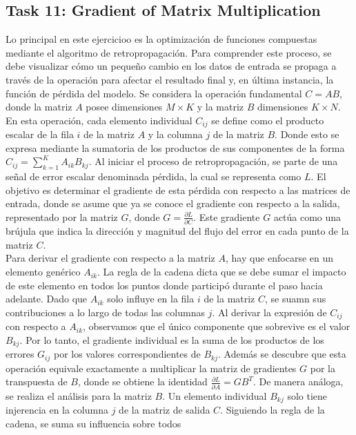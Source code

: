 ﻿\documentclass[12pt]{article}
\begin{document}
\subsection*{Task 11: Gradient of Matrix Multiplication}
Lo principal en este ejercicioo es la optimización de funciones 
compuestas mediante el algoritmo de retropropagación. Para comprender este proceso, se debe 
visualizar cómo un pequeño cambio en los datos de entrada se propaga a 
través de la operación para afectar el resultado final y, en última instancia,
la función de pérdida del modelo.
Se considera la operación fundamental $C = AB$, donde la matriz $A$ posee 
dimensiones $M \times K$ y la matriz $B$ dimensiones $K \times N$. En esta operación, 
cada elemento individual $C_{ij}$ se define como el producto
escalar de la fila $i$ de la matriz $A$ y la columna $j$ de la matriz $B$.
Donde esto se expresa mediante la sumatoria de los productos de
sus componentes de la forma $C_{ij} = \sum_{k=1}^{K} A_{ik} B_{kj}$.
Al iniciar el proceso de retropropagación, se parte de una señal de error 
escalar denominada pérdida, la cual se representa como $L$. El objetivo es determinar 
el gradiente de esta pérdida con respecto a las matrices de entrada, donde se asume 
que ya se conoce el gradiente con respecto a la salida, representado por la matriz 
$G$, donde $G = \frac{\partial L}{\partial C}$. Este gradiente $G$ actúa como una 
brújula que indica la dirección y magnitud del flujo del error en cada punto de 
la matriz $C$. \\
Para derivar el gradiente con respecto a la matriz $A$, hay que enfocarse en un
elemento genérico $A_{ik}$. La regla de la cadena dicta que se debe sumar el impacto de este elemento en 
todos los puntos donde participó durante el paso hacia adelante.
Dado que $A_{ik}$ solo influye en la fila $i$ de la matriz $C$, se suamn sus 
contribuciones a lo largo de todas las columnas $j$. Al derivar la expresión 
de $C_{ij}$ con respecto a $A_{ik}$, observamos que el único componente que 
sobrevive es el valor $B_{kj}$. Por lo tanto, el gradiente individual es la 
suma de los productos de los errores $G_{ij}$ por los valores correspondientes 
de $B_{kj}$. Además se descubre que esta operación equivale exactamente a multiplicar la matriz de gradientes $G$ por 
la transpuesta de $B$, donde se obtiene la identidad $\frac{\partial L}{\partial A} = G B^T$.
De manera análoga, se realiza el análisis para la matriz $B$. Un elemento 
individual $B_{kj}$ solo tiene injerencia en la columna $j$ de la matriz de 
salida $C$. Siguiendo la regla de la cadena, se suma su influencia sobre todos 
\end{document}
